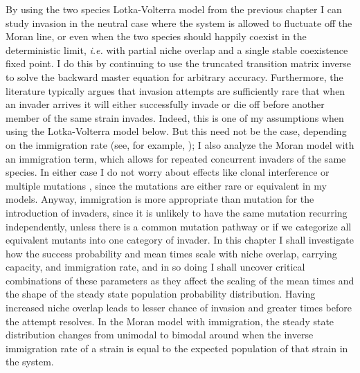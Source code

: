By using the two species Lotka-Volterra model from the previous chapter I can study invasion in the neutral case where the system is allowed to fluctuate off the Moran line, or even when the two species should happily coexist in the deterministic limit, \emph{i.e.} with partial niche overlap and a single stable coexistence fixed point. 
I do this by continuing to use the truncated transition matrix inverse to solve the backward master equation for arbitrary accuracy. 
Furthermore, the literature typically argues that invasion attempts are sufficiently rare that when an invader arrives it will either successfully invade or die off before another member of the same strain invades. 
Indeed, this is one of my assumptions when using the Lotka-Volterra model below. 
But this need not be the case, depending on the immigration rate (see, for example, \cite{Goyal2015}); I also analyze the Moran model with an immigration term, which allows for repeated concurrent invaders of the same species. 
In either case I do not worry about effects like clonal interference or multiple mutations \cite{Desai2007}, since the mutations are either rare or equivalent in my models. 
Anyway, immigration is more appropriate than mutation for the introduction of invaders, since it is unlikely to have the same mutation recurring independently, unless there is a common mutation pathway or if we categorize all equivalent mutants into one category of invader. 
In this chapter I shall investigate how the success probability and mean times scale with niche overlap, carrying capacity, and immigration rate, and in so doing I shall uncover critical combinations of these parameters as they affect the scaling of the mean times and the shape of the steady state population probability distribution. 
Having increased niche overlap leads to lesser chance of invasion and greater times before the attempt resolves. 
In the Moran model with immigration, the steady state distribution changes from unimodal to bimodal around when the inverse immigration rate of a strain is equal to the expected population of that strain in the system. 

